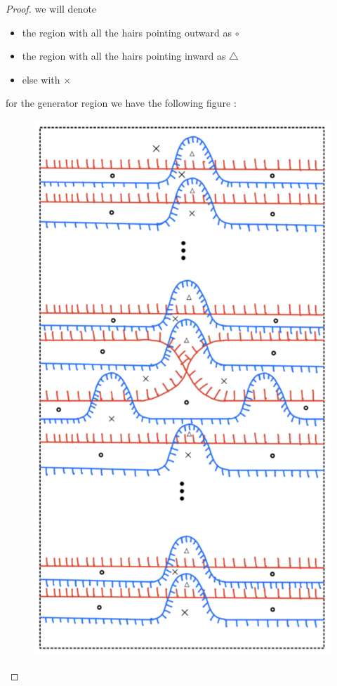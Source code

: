 \begin{proof}
we will denote
 
\begin{itemize}
\item the region with all the hairs pointing outward as $\circ$
\item the region with all the hairs pointing inward as $\bigtriangleup$
\item else with $\times$
\end{itemize}

for the generator region we have the following figure :

\begin{figure}[H] 
    \centering
    \includegraphics[scale = 0.55]{diagrams/natural_alternating_diagrams/11.png}
    \caption{}
    \label{fig:your-label}
\end{figure}


\end{proof}
